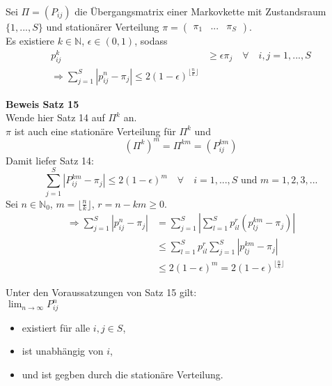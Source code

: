 \documentclass[a4paper,12pt]{article}
\begin{document}
\begin{tcolorbox}[breakable, colframe=green, colback=white, title=Satz 15]
	Sei $\Pi = (P_{ij})$ die Übergangsmatrix einer Markovkette mit Zustandsraum $\{1, ..., S\}$ und
	stationärer Verteilung $\pi = \begin{pmatrix} \pi_1 & ... & \pi_S  \end{pmatrix}$.\\
	Es existiere $k \in \mathbb{N}$, $\epsilon \in (0,1)$, sodass
	\begin{align*}
		p_{ij}^k & \geq \epsilon \pi_j \quad \forall \quad i,j = 1, ..., S \\
		\Rightarrow \sum_{j=1}^{S} |p_{ij}^n - \pi_j   | \leq 2(1-\epsilon)^{\lfloor\frac{n}{k} \rfloor}
	\end{align*}
\end{tcolorbox}

\textbf{Beweis Satz 15}\\
Wende hier Satz 14 auf $\Pi^k$ an.\\
$\pi$ ist auch eine stationäre Verteilung für $\Pi^k$ und
$$
	(\Pi^k)^m = \Pi^{km} = (P_{ij}^{km})
$$
Damit liefer Satz 14:
$$
	\sum_{j=1}^{S} |   P_{ij}^{km} - \pi_j | \leq 2(1-\epsilon)^m \quad \forall \quad i = 1, ..., S \text{ und } m = 1, 2, 3, ...
$$
Sei $n \in \mathbb{N}_0$, $m = \lfloor \frac{n}{k} \rfloor$, $r = n - km \geq 0$.
\begin{align*}
	\Rightarrow \sum_{j=1}^{S} | p_{ij}^n - \pi_j   | & = \sum_{j=1}^{S} | \sum_{l=1}^{S}p_{il}^{r}(p_{lj}^{km} - \pi_j)    | \\
	                                                  & \leq \sum_{l=1}^{S}p_{il}^r \sum_{j=1}^{S}|p_{lj}^{km} - \pi_j   |    \\
	                                                  & \leq 2(1-\epsilon)^m = 2(1-\epsilon)^{\lfloor\frac{n}{k} \rfloor}
\end{align*}


Unter den Voraussatzungen von Satz 15 gilt:\\
$\lim_{n \to \infty}P_{ij}^n$
\begin{itemize}
	\item existiert für alle $i,j \in S$,
	\item ist unabhängig von $i$,
	\item und ist gegben durch die stationäre Verteilung.
\end{itemize}
\end{document}
